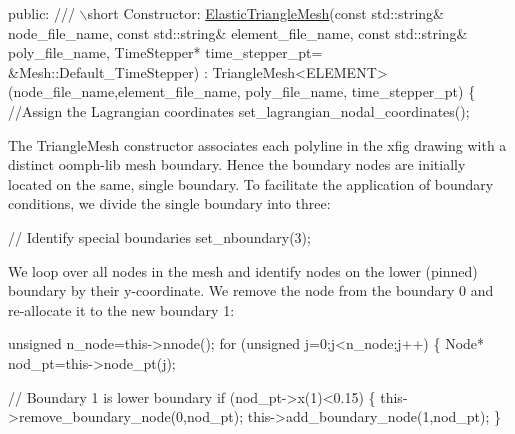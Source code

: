 \begin{DoxyCodeInclude}
 
\textcolor{keyword}{public}:
 \textcolor{comment}{}
\textcolor{comment}{ /// \(\backslash\)short Constructor: }
\textcolor{comment}{} \hyperlink{classElasticTriangleMesh}{ElasticTriangleMesh}(\textcolor{keyword}{const} std::string& node\_file\_name,
                     \textcolor{keyword}{const} std::string& element\_file\_name,
                     \textcolor{keyword}{const} std::string& poly\_file\_name,
                     TimeStepper* time\_stepper\_pt=
                     &Mesh::Default\_TimeStepper) : 
 TriangleMesh<ELEMENT>(node\_file\_name,element\_file\_name,
                       poly\_file\_name, time\_stepper\_pt)
  \{
   \textcolor{comment}{//Assign the Lagrangian coordinates}
   set\_lagrangian\_nodal\_coordinates();

\end{DoxyCodeInclude}


The {\ttfamily Triangle\+Mesh} constructor associates each polyline in the {\ttfamily xfig} drawing with a distinct {\ttfamily oomph-\/lib} mesh boundary. Hence the boundary nodes are initially located on the same, single boundary. To facilitate the application of boundary conditions, we divide the single boundary into three\+:


\begin{DoxyCodeInclude}

   \textcolor{comment}{// Identify special boundaries}
   set\_nboundary(3);

\end{DoxyCodeInclude}


We loop over all nodes in the mesh and identify nodes on the lower (pinned) boundary by their y-\/coordinate. We remove the node from the boundary 0 and re-\/allocate it to the new boundary 1\+:


\begin{DoxyCodeInclude}

   \textcolor{keywordtype}{unsigned} n\_node=this->nnode();
   \textcolor{keywordflow}{for} (\textcolor{keywordtype}{unsigned} j=0;j<n\_node;j++)
    \{
     Node* nod\_pt=this->node\_pt(j);

     \textcolor{comment}{// Boundary 1 is lower boundary}
     \textcolor{keywordflow}{if} (nod\_pt->x(1)<0.15)
      \{
       this->remove\_boundary\_node(0,nod\_pt);
       this->add\_boundary\_node(1,nod\_pt);
      \}

\end{DoxyCodeInclude}



